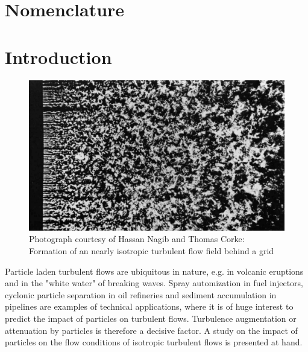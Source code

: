 \documentclass[11pt,a4paper,openany,oneside,parskip=half*]{article}
\begin{document}
\makenomenclature %


\renewcommand{\refname}{}
\renewcommand{\nomname}{}



\setlength{\columnsep}{30pt}
\setlength{\parindent}{0pt}

\pagebreak

\tableofcontents{} %
 
\pagebreak

\section{Nomenclature}
\printnomenclature
\pagebreak
\section{Introduction}
\begin{figure}[h]
	\centering
  \includegraphics[width=\textwidth]{./Abbildungen/TurbulentMotion_Introduction.png}
	\caption{Photograph courtesy of Hassan Nagib and Thomas Corke: Formation of an nearly isotropic turbulent flow field behind a grid}
	\label{introduction_picture}
\end{figure}
Particle laden turbulent flows are ubiquitous in nature, e.g. in volcanic eruptions and in the "white water" of breaking waves.
Spray automization in fuel injectors, cyclonic particle separation in oil refineries and sediment accumulation in pipelines are examples of technical applications, where it is of huge interest to predict the impact of particles on turbulent flows.
Turbulence augmentation or attenuation by particles is therefore a decisive factor.
\newline
A study on the impact of particles on the flow conditions of isotropic turbulent flows is presented at hand.
\end{document}
